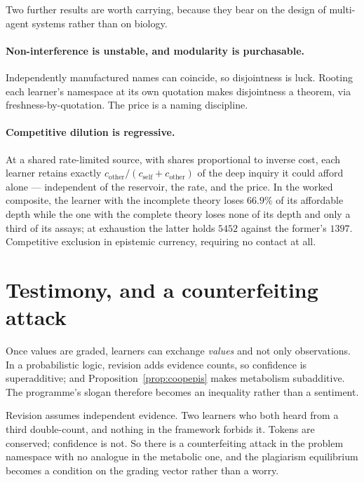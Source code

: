 Two further results are worth carrying, because they bear on the design of
multi-agent systems rather than on biology.

\paragraph{Non-interference is unstable, and modularity is purchasable.}
Independently manufactured names can coincide, so disjointness is luck. Rooting
each learner's namespace at its own quotation makes disjointness a theorem, via
freshness-by-quotation. The price is a naming discipline.

\paragraph{Competitive dilution is regressive.} At a shared rate-limited source,
with shares proportional to inverse cost, each learner retains exactly
$c_{\mathrm{other}} / (c_{\mathrm{self}} + c_{\mathrm{other}})$ of the deep
inquiry it could afford alone --- independent of the reservoir, the rate, and the
price. In the worked composite, the learner with the incomplete theory loses
$66.9\%$ of its affordable depth while the one with the complete theory loses none
of its depth and only a third of its assays; at exhaustion the latter holds
$5452$ against the former's $1397$. Competitive exclusion in epistemic currency,
requiring no contact at all.

\section{Testimony, and a counterfeiting attack}
\label{sec:testimony}

Once values are graded, learners can exchange \emph{values} and not only
observations. In a probabilistic logic, revision adds evidence counts, so
confidence is superadditive; and Proposition~\ref{prop:coopepis} makes metabolism
subadditive. The programme's slogan therefore becomes an inequality rather than a
sentiment.

\begin{observation}
\label{obs:minting}
Revision assumes independent evidence. Two learners who both heard from a third
double-count, and nothing in the framework forbids it. Tokens are conserved;
confidence is not. So there is a counterfeiting attack in the problem namespace
with no analogue in the metabolic one, and the plagiarism equilibrium becomes a
condition on the grading vector rather than a worry.
\end{observation}

